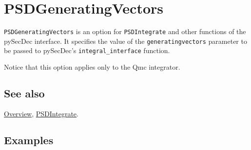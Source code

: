 \documentclass[../FeynHelpersManual.tex]{subfiles}
\begin{document}
\hypertarget{psdgeneratingvectors}{
\section{PSDGeneratingVectors}\label{psdgeneratingvectors}}

\texttt{PSDGeneratingVectors} is an option for \texttt{PSDIntegrate} and
other functions of the pySecDec interface. It specifies the value of the
\texttt{generatingvectors} parameter to be passed to pySecDec's
\texttt{integral_interface} function.

Notice that this option applies only to the Qmc integrator.

\subsection{See also}

\hyperlink{toc}{Overview}, \hyperlink{psdintegrate}{PSDIntegrate}.

\subsection{Examples}
\end{document}
